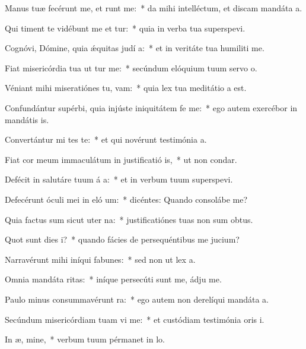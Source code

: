 \item Manus tuæ fecérunt me, et runt me:~* da mihi intelléctum, et discam mandáta a.
\item Qui timent te vidébunt me et tur:~* quia in verba tua superspevi.
\item Cognóvi, Dómine, quia ǽquitas judí a:~* et in veritáte tua humiliti me.
\item Fiat misericórdia tua ut tur me:~* secúndum elóquium tuum servo o.
\item Véniant mihi miseratiónes tu,  vam:~* quia lex tua meditátio a est.
\item Confundántur supérbi, quia injúste iniquitátem fe  me:~* ego autem exercébor in mandátis is.
\item Convertántur mi tes te:~* et qui novérunt testimónia a.
\item Fiat cor meum immaculátum in justificatió is,~* ut non condar.
\item Defécit in salutáre tuum á a:~* et in verbum tuum superspevi.
\item Defecérunt óculi mei in eló um:~* dicéntes: Quando consolábe me?
\item Quia factus sum sicut uter  na:~* justificatiónes tuas non sum obtus.
\item Quot sunt dies  i?~* quando fácies de persequéntibus me jucium?
\item Narravérunt mihi iníqui fabunes:~* sed non ut lex a.
\item Omnia mandáta  ritas:~* iníque persecúti sunt me, ádju me.
\item Paulo minus consummavérunt   ra:~* ego autem non derelíqui mandáta a.
\item Secúndum misericórdiam tuam vi me:~* et custódiam testimónia oris i.
\item In æ, mine,~* verbum tuum pérmanet in lo.
